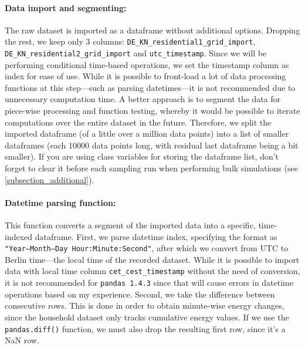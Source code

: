 \documentclass[a4paper,10pt]{report}
\begin{document}
\paragraph{Data import and segmenting:} The raw dataset is imported as a dataframe without additional options. Dropping the rest, we keep only 3 columns: \texttt{DE\_KN\_residential1\_grid\_import}, \texttt{DE\_KN\_residential2\_grid\_import} and \texttt{utc\_timestamp}. Since we will be performing conditional time-based operations, we set the timestamp column as index for ease of use. While it is possible to front-load a lot of data processing functions at this step---such as parsing datetimes---it is not recommended due to unnecessary computation time. A better approach is to segment the data for piece-wise processing and function testing, whereby it would be possible to iterate computations over the entire dataset in the future. Therefore, we split the imported dataframe (of a little over a million data points) into a list of smaller dataframes (each 10000 data points long, with residual last dataframe being a bit smaller). If you are using class variables for storing the dataframe list, don't forget to clear it before each sampling run when performing bulk simulations (see \cref{subsection_additional}).

\paragraph{Datetime parsing function:} This function converts a segment of the imported data into a specific, time-indexed dataframe. First, we parse datetime index, specifying the format as \texttt{"Year--Month--Day Hour:Minute:Second"}, after which we convert from UTC to Berlin time---the local time of the recorded dataset. While it is possible to import data with local time column \texttt{cet\_cest\_timestamp} without the need of conversion, it is not recommended for \texttt{pandas 1.4.3} since that will cause errors in datetime operations based on my experience. Second, we take the difference between consecutive rows. This is done in order to obtain minute-wise energy changes, since the household dataset only tracks cumulative energy values. If we use the \texttt{pandas.diff()} function, we must also drop the resulting first row, since it's a NaN row.
\end{document}
